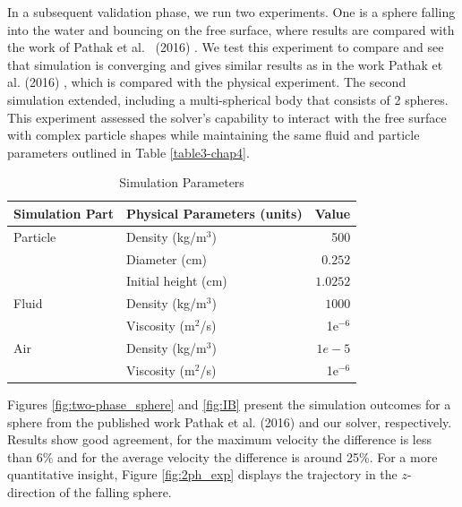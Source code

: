 In a subsequent validation phase, we run two experiments. One is a sphere falling into the water and bouncing on the free surface, where results are compared with the work of Pathak et al.~ (2016) \cite{pathak20163d}. We test this experiment to compare and see that simulation is converging and gives similar results as in the work Pathak et al. (2016) \cite{pathak20163d}, which is compared with the physical experiment.
The second simulation extended, including a multi-spherical body that consists of 2 spheres. This experiment assessed the solver's capability to interact with the free surface with complex particle shapes while maintaining the same fluid and particle parameters outlined in Table \ref{table3-chap4}.

\begin{table}[H]
    \centering
    \caption{Simulation Parameters} \label{table2-chap4}
    \begin{tabular}{llr}
        \toprule
        \hline
        Simulation Part         & Physical Parameters (units) & Value \\
        \hline
        \midrule
        Particle                 & Density (kg/m$^3$)          & 500    \\
                         & Diameter (cm)          & $0.252$    \\
                         & Initial height (cm)          & $1.0252$    \\
                         \hline
        Fluid                  & Density (kg/m$^3$)           & $1000$   \\
                                & Viscosity (m$^2$/s)         & 1e$^{-6}$    \\
                                \hline
         Air                  & Density (kg/m$^3$)           & $1e-5$   \\
                                & Viscosity (m$^2$/s)         & 1e$^{-6}$    \\
                                \hline
        \bottomrule
     \end{tabular}
\end{table}
Figures \ref{fig:two-phase_sphere} and \ref{fig:IB} present the simulation outcomes for a sphere from the published work Pathak et al. (2016) \cite{pathak20163d} and our solver, respectively. Results show good agreement, for the maximum velocity the difference is less than 6\% and for the average velocity the difference is around 25\%. For a more quantitative insight, Figure \ref{fig:2ph_exp} displays the trajectory in the $z$-direction of the falling sphere.


